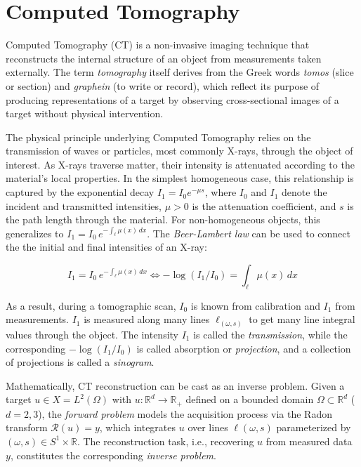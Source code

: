 \section{Computed Tomography}

Computed Tomography (CT) is a non-invasive imaging technique that reconstructs the internal structure of an object from measurements taken externally. The term \textit{tomography} itself derives from the Greek words \textit{tomos} (slice or section) and \textit{graphein} (to write or record), which reflect its purpose of producing representations of a target by observing cross-sectional images of a target without physical intervention.

The physical principle underlying Computed Tomography relies on the transmission of waves or particles, most commonly X-rays, through the object of interest. As X-rays traverse matter, their intensity is attenuated according to the material's local properties. In the simplest homogeneous case, this relationship is captured by the exponential decay $I_1 = I_0 e^{-\mu s}$, where $I_0$ and $I_1$ denote the incident and transmitted intensities, $\mu > 0$ is the attenuation coefficient, and $s$ is the path length through the material. For non-homogeneous objects, this generalizes to $I_1 = I_0 \, e^{-\int_{\ell} \mu(x)\, dx}$. The \textit{Beer-Lambert law} can be used to connect the the initial and final intensities of an X-ray:

\begin{equation}
    I_1 = I_0 \, e^{-\int_{\ell} \mu(x)\, dx} \Longleftrightarrow -\log(I_1/I_0) = \int_{\ell} \mu(x)\, dx
\end{equation} 

As a result, during a tomographic scan, $I_0$ is known from calibration and $I_1$ from measurements. $I_1$ is measured along many lines $\ell_{(\omega,s)}$ to get many line integral values through the object. The intensity $I_1$ is called the \textit{transmission}, while the corresponding $-\log(I_1/I_0)$ is called absorption or \textit{projection}, and a collection of projections is called a \textit{sinogram}.

Mathematically, CT reconstruction can be cast as an inverse problem. Given a target $u \in X = L^2(\Omega)$ with $u \colon \mathbb{R}^d \to \mathbb{R}_+$ defined on a bounded domain $\Omega \subset \mathbb{R}^d$ ($d = 2, 3$), the \textit{forward problem} models the acquisition process via the Radon transform $\mathcal{R}(u) = y$, which integrates $u$ over lines $\ell(\omega, s)$ parameterized by $(\omega,s) \in S^1 \times \mathbb{R}$. The reconstruction task, i.e., recovering $u$ from measured data $y$, constitutes the corresponding \textit{inverse problem}.

